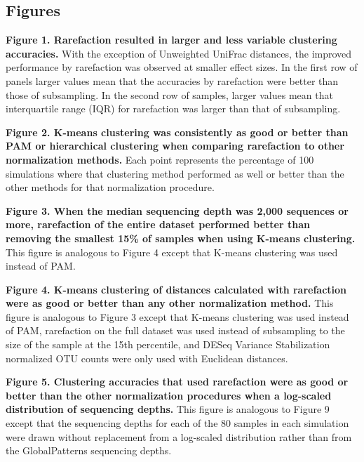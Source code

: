 \documentclass[
]{article}
\begin{document}

\setlength{\parindent}{0in}
\setlength{\leftskip}{0in}

\newpage

\hypertarget{figures}{%
\subsection{Figures}\label{figures}}

\textbf{Figure 1. Rarefaction resulted in larger and less variable
clustering accuracies.} With the exception of Unweighted UniFrac
distances, the improved performance by rarefaction was observed at
smaller effect sizes. In the first row of panels larger values mean that
the accuracies by rarefaction were better than those of subsampling. In
the second row of samples, larger values mean that interquartile range
(IQR) for rarefaction was larger than that of subsampling.

\textbf{Figure 2. K-means clustering was consistently as good or better
than PAM or hierarchical clustering when comparing rarefaction to other
normalization methods.} Each point represents the percentage of 100
simulations where that clustering method performed as well or better
than the other methods for that normalization procedure.

\textbf{Figure 3. When the median sequencing depth was 2,000 sequences
or more, rarefaction of the entire dataset performed better than
removing the smallest 15\% of samples when using K-means clustering.}
This figure is analogous to Figure 4 except that K-means clustering was
used instead of PAM.

\textbf{Figure 4. K-means clustering of distances calculated with
rarefaction were as good or better than any other normalization method.}
This figure is analogous to Figure 3 except that K-means clustering was
used instead of PAM, rarefaction on the full dataset was used instead of
subsampling to the size of the sample at the 15th percentile, and DESeq
Variance Stabilization normalized OTU counts were only used with
Euclidean distances.

\textbf{Figure 5. Clustering accuracies that used rarefaction were as
good or better than the other normalization procedures when a log-scaled
distribution of sequencing depths.} This figure is analogous to Figure 9
except that the sequencing depths for each of the 80 samples in each
simulation were drawn without replacement from a log-scaled distribution
rather than from the GlobalPatterns sequencing depths.
\end{document}
